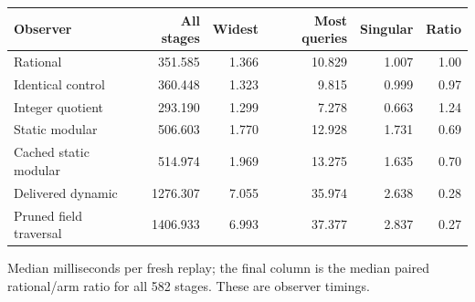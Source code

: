\begin{center}\small
\begin{tabular}{@{}lrrrrr@{}}
\toprule
Observer & All stages & Widest & Most queries & Singular & Ratio \\
\midrule
Rational & 351.585 & 1.366 & 10.829 & 1.007 & 1.00 \\
Identical control & 360.448 & 1.323 & 9.815 & 0.999 & 0.97 \\
Integer quotient & 293.190 & 1.299 & 7.278 & 0.663 & 1.24 \\
Static modular & 506.603 & 1.770 & 12.928 & 1.731 & 0.69 \\
Cached static modular & 514.974 & 1.969 & 13.275 & 1.635 & 0.70 \\
Delivered dynamic & 1276.307 & 7.055 & 35.974 & 2.638 & 0.28 \\
Pruned field traversal & 1406.933 & 6.993 & 37.377 & 2.837 & 0.27 \\
\bottomrule
\end{tabular}
\end{center}
Median milliseconds per fresh replay; the final column is the median paired rational/arm ratio for all 582 stages. These are observer timings.
